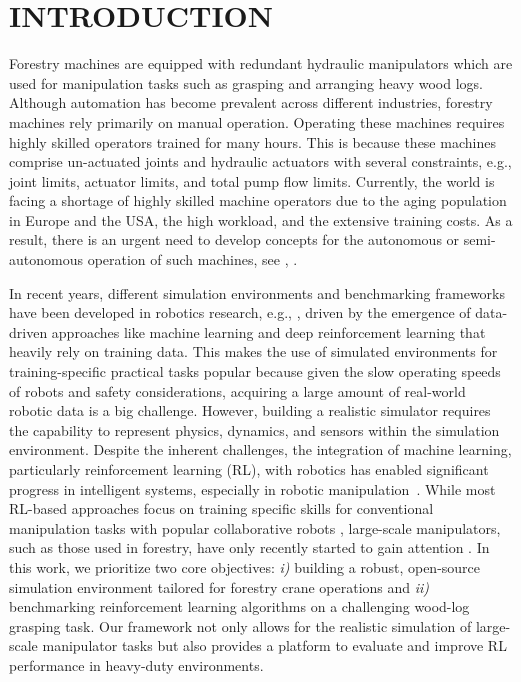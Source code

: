 \section{INTRODUCTION} \label{Sec:Intro}
Forestry machines are equipped with redundant hydraulic manipulators which are used for manipulation tasks such as grasping and arranging heavy wood logs. 
Although automation has become prevalent across different industries, forestry machines rely primarily on manual operation. 
Operating these machines requires highly skilled operators trained for many hours. 
This is because these machines comprise un-actuated joints and hydraulic actuators with
several constraints, e.g., joint limits, actuator limits, and total pump flow limits. 
Currently, the world is facing a shortage of highly skilled machine operators due to the aging population in Europe and the USA, the high workload, and the extensive training costs. 
As a result, there is an urgent need to develop concepts for the autonomous or semi-autonomous operation of such machines, see %
\cite{ortiz2014increasing}, \cite{kalmari2017coordinated}. 

In recent years, different simulation environments and benchmarking frameworks have been developed in robotics research, e.g.,  \cite{ibarz2021train,sunderhauf2018limits,nguyen2024language,kumar2024robohive,mittal2023orbit,vuong2023grasp}, driven by the emergence of data-driven approaches like machine learning and deep reinforcement learning that heavily rely on training data. This makes the use of simulated environments for training-specific practical tasks popular because given the slow operating speeds of robots and safety considerations, acquiring a large amount of real-world robotic data is a big challenge. However, building a realistic simulator requires the capability to represent physics, dynamics, and sensors within the simulation environment. Despite the inherent challenges, the integration of machine learning, particularly reinforcement learning (RL), with robotics has enabled significant progress in intelligent systems, especially in robotic manipulation~\cite{wang2023dexterous,zhou2023hacman,vuong2024language,vu2025online}. While most RL-based approaches focus on training specific skills for conventional manipulation tasks with popular collaborative robots \cite{mu2021maniskill}, large-scale manipulators, such as those used in forestry, have only recently started to gain attention \cite{andersson2021reinforcement,ayoub2023grasp}. In this work, we prioritize two core objectives: \textit{i)} building a robust, open-source simulation environment tailored for forestry crane operations and \textit{ii)} benchmarking reinforcement learning algorithms on a challenging wood-log grasping task. Our framework not only allows for the realistic simulation of large-scale manipulator tasks but also provides a platform to evaluate and improve RL performance in heavy-duty environments.


